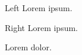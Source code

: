 \documentclass{article}
\begin{document}
\beginnumbering
\pstart
{}
\pend

\begin{pairs}  
\begin{Leftside} 
    \resumenumbering  
    \pstart  
        Left Lorem ipsum.
    \pend  
    \pausenumbering
\end{Leftside} 
\begin{Rightside}   
    \beginnumbering  
    \pstart  
        Right Lorem ipsum.
    \pend  
    \pausenumbering
\end{Rightside}  
\end{pairs}  
\Columns

\resumenumbering
\pstart  
    Lorem  dolor.
\pend  
\pausenumbering
\end{document}
